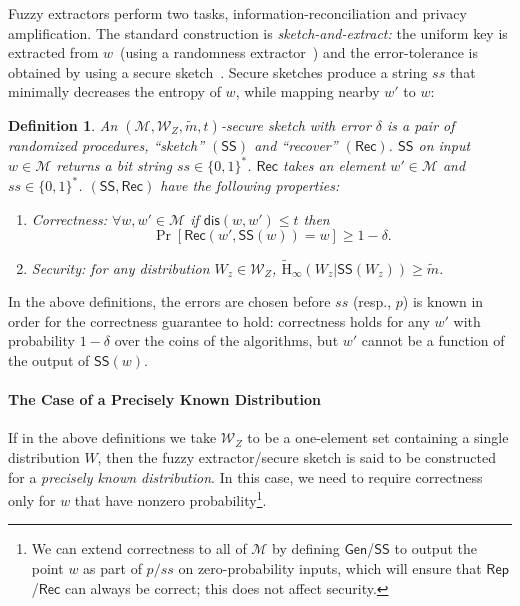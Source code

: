 \documentclass[11pt]{article}
\newtheorem{definition}[theorem]{Definition}
\newcommand{\class}[1]{{\ensuremath{\mathsf{#1}}}}
\newcommand{\gen}{\ensuremath{\class{Gen}}\xspace}
\newcommand{\rep}{\ensuremath{\class{Rep}}\xspace}
\newcommand{\sketch}{\ensuremath{\class{SS}}\xspace}
\newcommand{\rec}{\ensuremath{\class{Rec}}\xspace}
\newcommand{\dis}{\ensuremath{\mathsf{dis}}}
\newcommand{\Hav}{\tilde{\mathrm{H}}_\infty}
\begin{document}
\noindent
Fuzzy extractors perform two tasks, information-reconciliation and privacy amplification.  The standard construction is \emph{sketch-and-extract:} the uniform key is extracted from $w$~(using a randomness extractor~\cite{nisan1993randomness}) and the error-tolerance is obtained by using a secure sketch~\cite[Lemma 4.1]{DBLP:journals/siamcomp/DodisORS08}.  Secure sketches produce a string $ss$ that minimally decreases the entropy of $w$, while mapping nearby $w'$ to $w$:
\begin{definition}
\label{def:secure sketch}
An $(\mathcal{M},\mathcal{W}_Z, \tilde{m}, t)$-\emph{secure sketch} with error $\delta$ is a pair of randomized procedures, ``sketch'' $(\sketch)$ and ``recover'' $(\rec)$.  \sketch on input $w\in\mathcal{M}$ returns a bit string $ss\in\{0,1\}^*$.  \rec takes an element $w'\in\mathcal{M}$ and $ss\in\{0,1\}^*$.  $(\sketch, \rec)$ have the following properties:
\begin{enumerate}
\item \emph{Correctness}: $ \forall w, w'\in\mathcal{M}$ if $\dis(w,w')\leq t$ then \[\Pr[\rec(w',\sketch(w))=w]\geq 1-\delta.\]
\item \emph{Security}: for any distribution $W_z\in\mathcal{W}_Z$, $\Hav(W_z|\sketch(W_z))\geq \tilde{m}$.
\end{enumerate}
\end{definition}


\noindent
In the above definitions, the errors are chosen before $ss$ (resp., $p$) is known in order for the correctness guarantee to hold: correctness holds for any $w'$ with probability $1-\delta$ over the coins of the algorithms, but $w'$ cannot be a function of the output of  $\sketch(w)$. 


\paragraph{The Case of a Precisely Known Distribution}
If in the above definitions we take $\mathcal{W}_Z$ to be a one-element set containing a single distribution $W$, then the fuzzy extractor/secure sketch is said to be constructed for a \emph{precisely known distribution}.  In this case, we need to require correctness only for $w$ that have nonzero probability\footnote{We can extend correctness to all of $\mathcal{M}$ by defining $\gen$/$\sketch$ to output the point $w$ as part of $p/ss$ on zero-probability inputs, which will ensure that $\rep$/$\rec$ can always be correct; this does not affect security.}.
\end{document}
